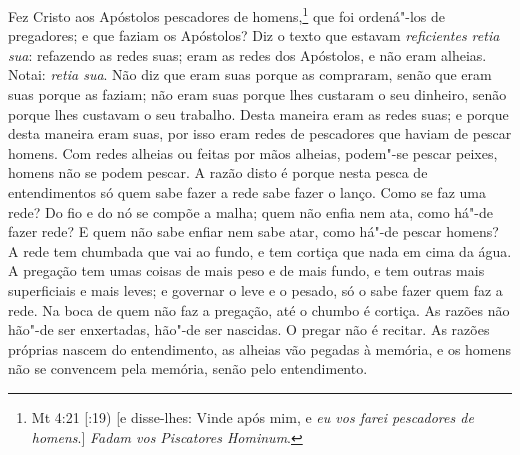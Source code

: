 Fez Cristo aos Apóstolos pescadores de homens,\footnote{Mt 4:21 [:19) [e disse-lhes: Vinde após mim, e \emph{eu vos farei pescadores de homens}.] \textit{Fadam vos Piscatores Hominum}.} que foi ordená"-los de
pregadores; e que faziam os Apóstolos? Diz o texto que estavam
\emph{reficientes retia sua}: refazendo as redes suas; eram as redes
dos Apóstolos, e não eram alheias. Notai: \emph{retia sua}. Não diz que
eram suas porque as compraram, senão que eram suas porque as faziam; não
eram suas porque lhes custaram o seu dinheiro, senão porque lhes
custavam o seu trabalho. Desta maneira eram as redes suas; e porque
desta maneira eram suas, por isso eram redes de pescadores que haviam de
pescar homens. Com redes alheias ou feitas por mãos alheias, podem"-se
pescar peixes, homens não se podem pescar. A razão disto é porque nesta
pesca de entendimentos só quem sabe fazer a rede sabe fazer o lanço.
Como se faz uma rede? Do fio e do nó se compõe a malha; quem não
enfia nem ata, como há"-de fazer rede? E quem não sabe enfiar nem sabe
atar, como há"-de pescar homens? A rede tem chumbada que vai ao fundo, e
tem cortiça que nada em cima da água. A pregação tem umas coisas de mais
peso e de mais fundo, e tem outras mais superficiais e mais leves; e
governar o leve e o pesado, só o sabe fazer quem faz a rede. Na boca de
quem não faz a pregação, até o chumbo é cortiça.
As razões não hão"-de ser enxertadas, hão"-de ser nascidas. O
pregar não é recitar. As razões próprias nascem do entendimento, as
alheias vão pegadas à memória, e os homens não se convencem pela
memória, senão pelo entendimento.

